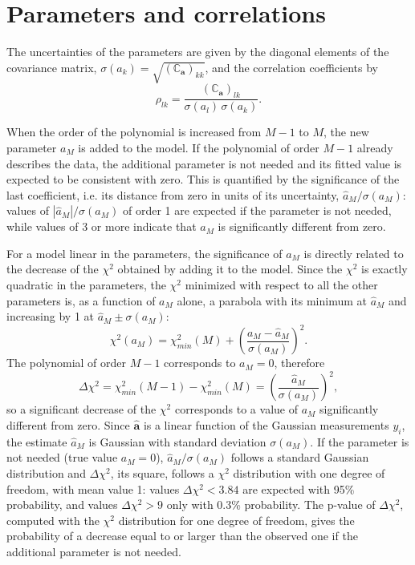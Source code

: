 \documentclass[11pt,a4paper]{article}
\begin{document}
	\section*{Parameters and correlations}

	The uncertainties of the parameters are given by the diagonal elements of the covariance matrix, $\sigma(a_k) = \sqrt{(\mathbb{C}_{\mathbf{a}})_{kk}}$, and the correlation coefficients by
	\begin{equation}
		\rho_{lk} = \frac{(\mathbb{C}_{\mathbf{a}})_{lk}}{\sigma(a_l)\, \sigma(a_k)} .
	\end{equation}

	When the order of the polynomial is increased from $M-1$ to $M$, the new parameter $a_M$ is added to the model.
	If the polynomial of order $M-1$ already describes the data, the additional parameter is not needed and its fitted value is expected to be consistent with zero.
	This is quantified by the significance of the last coefficient, i.e. its distance from zero in units of its uncertainty, $\hat a_M / \sigma(a_M)$: values of $|\hat a_M| / \sigma(a_M)$ of order 1 are expected if the parameter is not needed, while values of 3 or more indicate that $a_M$ is significantly different from zero.

	For a model linear in the parameters, the significance of $a_M$ is directly related to the decrease of the $\chi^2$ obtained by adding it to the model.
	Since the $\chi^2$ is exactly quadratic in the parameters, the $\chi^2$ minimized with respect to all the other parameters is, as a function of $a_M$ alone, a parabola with its minimum at $\hat a_M$ and increasing by 1 at $\hat a_M \pm \sigma(a_M)$:
	\begin{equation}
		\chi^2(a_M) = \chi^2_{min}(M) + \left(\frac{a_M - \hat a_M}{\sigma(a_M)}\right)^2 .
	\end{equation}
	The polynomial of order $M-1$ corresponds to $a_M = 0$, therefore
	\begin{equation}
		\Delta\chi^2 = \chi^2_{min}(M-1) - \chi^2_{min}(M) = \left(\frac{\hat a_M}{\sigma(a_M)}\right)^2 ,
	\end{equation}
	so a significant decrease of the $\chi^2$ corresponds to a value of $a_M$ significantly different from zero.
	Since $\hat{\mathbf{a}}$ is a linear function of the Gaussian measurements $y_i$, the estimate $\hat a_M$ is Gaussian with standard deviation $\sigma(a_M)$.
	If the parameter is not needed (true value $a_M = 0$), $\hat a_M / \sigma(a_M)$ follows a standard Gaussian distribution and $\Delta\chi^2$, its square, follows a $\chi^2$ distribution with one degree of freedom, with mean value 1: values $\Delta\chi^2 < 3.84$ are expected with 95\% probability, and values $\Delta\chi^2 > 9$ only with 0.3\% probability.
	The p-value of $\Delta\chi^2$, computed with the $\chi^2$ distribution for one degree of freedom, gives the probability of a decrease equal to or larger than the observed one if the additional parameter is not needed.
\end{document}
